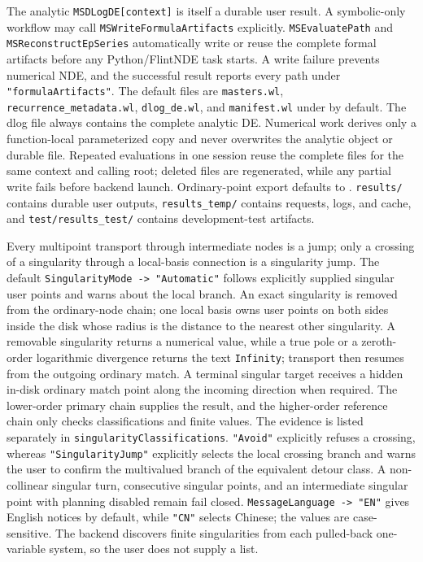 \documentclass[11pt,a4paper]{article}
\begin{document}
The analytic \texttt{MSDLogDE[context]} is itself a durable user result. A symbolic-only
workflow may call \texttt{MSWriteFormula\allowbreak Artifacts} explicitly. \texttt{MSEvaluatePath}
and \texttt{MSReconstructEp\allowbreak Series} automatically write or reuse the complete formal
artifacts before any Python/FlintNDE task starts. A write failure prevents numerical NDE,
and the successful result reports every path under \texttt{"formula\allowbreak Artifacts"}. The default
files are \texttt{masters.wl},
\texttt{recurrence\_metadata.wl}, \texttt{dlog\_de.wl}, and \texttt{manifest.wl} under
 by default. The dlog file always contains the
complete analytic DE. Numerical work derives only a function-local parameterized copy and never
overwrites the analytic object or durable file. Repeated evaluations in one session reuse the
complete files for the same context and calling root; deleted files are regenerated, while any
partial write fails before backend launch. Ordinary-point export defaults to
.
\texttt{results/} contains durable user outputs, \texttt{results\_temp/} contains requests,
logs, and cache, and \texttt{test/results\_test/} contains development-test artifacts.

Every multipoint transport through intermediate nodes is a jump; only a crossing of a
singularity through a local-basis connection is a singularity jump.  The default
\texttt{SingularityMode -> "Automatic"} follows explicitly supplied singular user points and
warns about the local branch.  An exact singularity is removed from the ordinary-node chain;
one local basis owns user points on both sides inside the disk whose radius is the distance to
the nearest other singularity.  A removable singularity returns a numerical value, while a true
pole or a zeroth-order logarithmic divergence returns the text \texttt{Infinity}; transport then
resumes from the outgoing ordinary match.  A terminal singular target receives a hidden in-disk
ordinary match point along the incoming direction when required.  The lower-order primary chain
supplies the result, and the higher-order reference chain only checks classifications and finite
values.  The evidence is listed separately in \texttt{singularityClassifications}.
\texttt{"Avoid"} explicitly refuses a crossing, whereas \texttt{"SingularityJump"} explicitly
selects the local crossing branch and warns the user to confirm the multivalued branch of the
equivalent detour class.  A non-collinear singular turn, consecutive singular points, and an
intermediate singular point with planning disabled remain fail closed.
\texttt{MessageLanguage -> "EN"} gives English notices by default, while
\texttt{"CN"} selects Chinese; the values are case-sensitive. The backend discovers finite
singularities from each pulled-back one-variable system, so the user does not supply a list.
\end{document}
